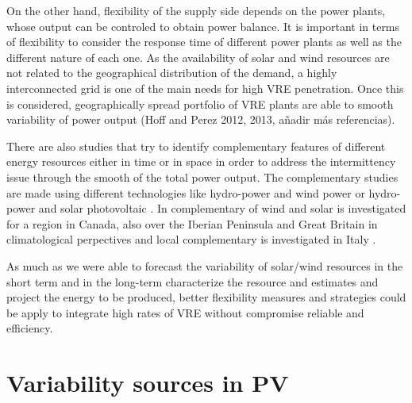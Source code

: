On the other hand, flexibility of the supply side depends on the power plants, whose output can be controled to obtain power balance. It is important in terms of flexibility to consider the response time of different power plants as well as the different nature of each one. As the availability of solar and wind resources are not related to the geographical distribution of the demand, a highly interconnected grid is one of the main needs for high VRE penetration. Once this is considered, geographically spread portfolio of VRE plants are able to smooth variability of power output \cite*{KROPOSKI2017, Marcos2012}(Hoff and Perez 2012, 2013, añadir más referencias).


There are also studies that try to identify complementary features of different energy resources either in time or in space in order to address the intermittency issue through the smooth of the total power output. The complementary studies are made using different technologies like hydro-power and wind power \cite*{Denault2009, Silva2016} or hydro-power and solar photovoltaic \cite*{Francois2016, Beluco2012, Kougias2016}. In \cite*{Hoicka2011} complementary of wind and solar is investigated for a region in Canada, also over the Iberian Peninsula \cite*{Santos-Alamillos2012, Jerez2013b} and Great Britain \cite*{Bett2016} in climatological perpectives and local complementary is investigated in Italy \cite*{Monforti2014}. 


{\color{red}As much as we were able to forecast the variability of solar/wind resources in the short term and in the long-term characterize the resource and estimates and project the energy to be produced, better flexibility measures and strategies could be apply to integrate high rates of VRE without compromise reliable and efficiency.}

\section{Variability sources in PV}

